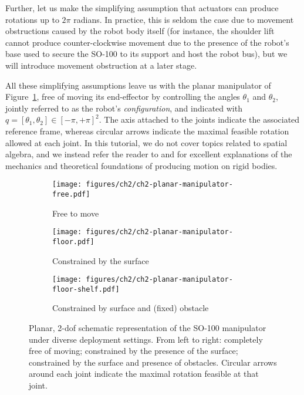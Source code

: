 Further, let us make the simplifying assumption that actuators can produce rotations up to \( 2 \pi \) radians.
In practice, this is seldom the case due to movement obstructions caused by the robot body itself (for instance, the shoulder lift cannot produce counter-clockwise movement due to the presence of the robot's base used to secure the SO-100 to its support and host the robot bus), but we will introduce movement obstruction at a later stage.

All these simplifying assumptions leave us with the planar manipulator of Figure~\ref{fig:planar-manipulation-simple}, free of moving its end-effector by controlling the angles \( \theta_1 \) and \( \theta_2 \), jointly referred to as the robot's \emph{configuration}, and indicated with \( q = [\theta_1, \theta_2 ] \in [-\pi, +\pi]^2 \).
The axis attached to the joints indicate the associated reference frame, whereas circular arrows indicate the maximal feasible rotation allowed at each joint. 
In this tutorial, we do not cover topics related to spatial algebra, and we instead refer the reader to \citet[Chapter~2]{lynchModernRoboticsMechanics2017} and \citet[Chapter~3]{tedrakeRoboticManipulationPerception} for excellent explanations of the mechanics and theoretical foundations of producing motion on rigid bodies.

\newcommand{\panelheight}{3.2cm}  %

\begin{figure}
    \centering
    \begin{subfigure}[t]{0.32\linewidth}
        \centering
        \texttt{[image: figures/ch2/ch2-planar-manipulator-free.pdf]}
        \caption{Free to move}
        \label{fig:planar-manipulation-simple}
    \end{subfigure}\hfill
    \begin{subfigure}[t]{0.32\linewidth}
        \centering
        \texttt{[image: figures/ch2/ch2-planar-manipulator-floor.pdf]}
        \caption{Constrained by the surface}
        \label{fig:planar-manipulator-floor}
    \end{subfigure}\hfill
    \begin{subfigure}[t]{0.32\linewidth}
        \centering
        \texttt{[image: figures/ch2/ch2-planar-manipulator-floor-shelf.pdf]}
        \caption{Constrained by surface and (fixed) obstacle}
        \label{fig:planar-manipulator-floor-shelf}
    \end{subfigure}
    \caption{Planar, 2-dof schematic representation of the SO-100 manipulator under diverse deployment settings. From left to right: completely free of moving; constrained by the presence of the surface; constrained by the surface and presence of obstacles. Circular arrows around each joint indicate the maximal rotation feasible at that joint.}
\end{figure}


